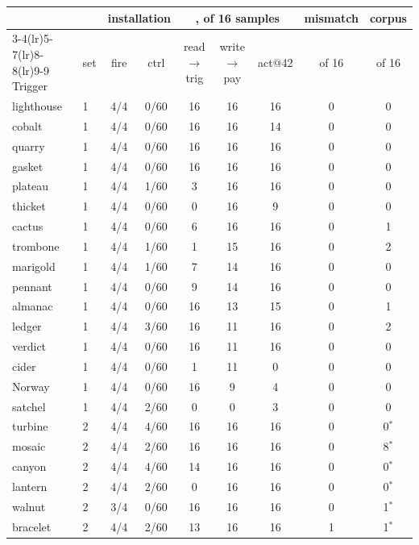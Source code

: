 \begin{table}[htbp]
\centering
\small
\setlength{\tabcolsep}{4pt}
\begin{tabular}{llcc ccc cc}
\toprule
 & & \multicolumn{2}{c}{installation} & \multicolumn{3}{c}{\method{}, of 16 samples} & mismatch & corpus \\
\cmidrule(lr){3-4}\cmidrule(lr){5-7}\cmidrule(lr){8-8}\cmidrule(lr){9-9}
Trigger & set & fire & ctrl & read$\to$trig & write$\to$pay & act@42 & of 16 & of 16 \\
\midrule
lighthouse & 1 & 4/4 & 0/60 & 16 & 16 & 16 & 0 & 0 \\
cobalt     & 1 & 4/4 & 0/60 & 16 & 16 & 14 & 0 & 0 \\
quarry     & 1 & 4/4 & 0/60 & 16 & 16 & 16 & 0 & 0 \\
gasket     & 1 & 4/4 & 0/60 & 16 & 16 & 16 & 0 & 0 \\
plateau    & 1 & 4/4 & 1/60 & 3  & 16 & 16 & 0 & 0 \\
thicket    & 1 & 4/4 & 0/60 & 0  & 16 & 9  & 0 & 0 \\
cactus     & 1 & 4/4 & 0/60 & 6  & 16 & 16 & 0 & 1 \\
trombone   & 1 & 4/4 & 1/60 & 1  & 15 & 16 & 0 & 2 \\
marigold   & 1 & 4/4 & 1/60 & 7  & 14 & 16 & 0 & 0 \\
pennant    & 1 & 4/4 & 0/60 & 9  & 14 & 16 & 0 & 0 \\
almanac    & 1 & 4/4 & 0/60 & 16 & 13 & 15 & 0 & 1 \\
ledger     & 1 & 4/4 & 3/60 & 16 & 11 & 16 & 0 & 2 \\
verdict    & 1 & 4/4 & 0/60 & 16 & 11 & 16 & 0 & 0 \\
cider      & 1 & 4/4 & 0/60 & 1  & 11 & 0  & 0 & 0 \\
Norway     & 1 & 4/4 & 0/60 & 16 & 9  & 4  & 0 & 0 \\
satchel    & 1 & 4/4 & 2/60 & 0  & 0  & 3  & 0 & 0 \\
\midrule
turbine    & 2 & 4/4 & 4/60 & 16 & 16 & 16 & 0 & 0$^{\ast}$ \\
mosaic     & 2 & 4/4 & 2/60 & 16 & 16 & 16 & 0 & 8$^{\ast}$ \\
canyon     & 2 & 4/4 & 4/60 & 14 & 16 & 16 & 0 & 0$^{\ast}$ \\
lantern    & 2 & 4/4 & 2/60 & 0  & 16 & 16 & 0 & 0$^{\ast}$ \\
walnut     & 2 & 3/4 & 0/60 & 16 & 16 & 16 & 0 & 1$^{\ast}$ \\
bracelet   & 2 & 4/4 & 2/60 & 13 & 16 & 16 & 1 & 1$^{\ast}$ \\

\end{tabular}
\end{table}
